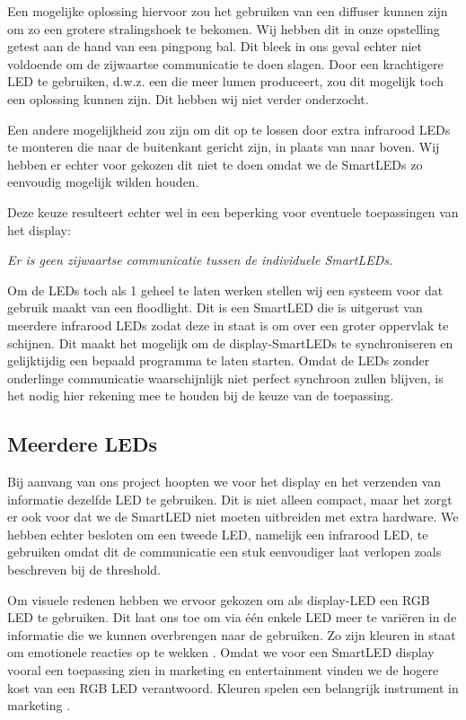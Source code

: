\documentclass{article}
\begin{document}
Een mogelijke oplossing hiervoor zou het gebruiken van een diffuser kunnen zijn om zo een grotere stralingshoek te bekomen. Wij hebben dit in onze opstelling getest aan de hand van een pingpong bal. Dit bleek in ons geval echter niet voldoende om de zijwaartse communicatie te doen slagen. Door een krachtigere LED te gebruiken, d.w.z. een die meer lumen produceert, zou dit mogelijk toch een oplossing kunnen zijn. Dit hebben wij niet verder onderzocht. 

Een andere mogelijkheid zou zijn om dit op te lossen door extra infrarood LEDs te monteren die naar de buitenkant gericht zijn, in plaats van naar boven. Wij hebben er echter voor gekozen dit niet te doen omdat we de SmartLEDs zo eenvoudig mogelijk wilden houden. 

Deze keuze resulteert echter wel in een beperking voor eventuele toepassingen van het display:
\medskip
\begin{displayquote}

 \textit{Er is geen zijwaartse communicatie tussen de individuele SmartLEDs.}
\end{displayquote}
\medskip

Om de LEDs toch als 1 geheel te laten werken stellen wij een systeem voor dat gebruik maakt van een floodlight. Dit is een SmartLED die is uitgerust van meerdere infrarood LEDs zodat deze in staat is om over een groter oppervlak te schijnen. Dit maakt het mogelijk om de display-SmartLEDs te synchroniseren en gelijktijdig een bepaald programma te laten starten. Omdat de LEDs zonder onderlinge communicatie waarschijnlijk niet perfect synchroon zullen blijven, is het nodig hier rekening mee te houden bij de keuze van de toepassing. 




\subsection{Meerdere LEDs}
Bij aanvang van ons project hoopten we voor het display en het verzenden van informatie dezelfde LED te gebruiken. Dit is niet alleen compact, maar het zorgt er ook voor dat we de SmartLED niet moeten uitbreiden met extra hardware. We hebben echter besloten om een tweede LED, namelijk een infrarood LED, te gebruiken omdat dit de communicatie een stuk eenvoudiger laat verlopen  zoals beschreven bij de threshold. 

Om visuele redenen hebben we ervoor gekozen om als display-LED een RGB LED te gebruiken. Dit laat ons toe om via \'e\'en enkele LED meer te vari\"eren in de informatie die we kunnen overbrengen naar de gebruiken. Zo zijn kleuren in staat om emotionele reacties op te wekken \cite{color}. Omdat we voor een SmartLED display vooral een toepassing zien in marketing en entertainment vinden we de hogere kost van een RGB LED verantwoord. Kleuren spelen een belangrijk instrument in marketing \cite{marketing}.
\end{document}
